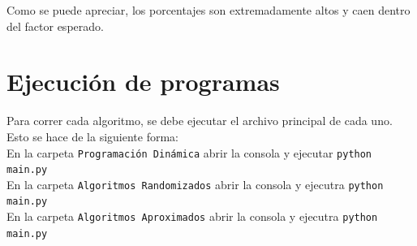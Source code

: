 \documentclass[a4paper, 10pt]{article}
\def\code#1{\texttt{#1}}
\newcommand\tab[1][0.5cm]{\hspace*{#1}}
\begin{document}
                \tab Como se puede apreciar, los porcentajes son extremadamente altos y caen dentro del factor esperado.
    \newpage

    \section{Ejecución de programas}
    \tab Para correr cada algoritmo, se debe ejecutar el archivo principal de cada uno.
    Esto se hace de la siguiente forma: \\
    \tab\tab En la carpeta \code{Programación Dinámica} abrir la consola y ejecutar \code{python main.py} \\
    \tab\tab En la carpeta \code{Algoritmos Randomizados} abrir la consola y ejecutra \code{python main.py} \\
    \tab\tab En la carpeta \code{Algoritmos Aproximados} abrir la consola y ejecutra \code{python main.py} \\

\end{document}
